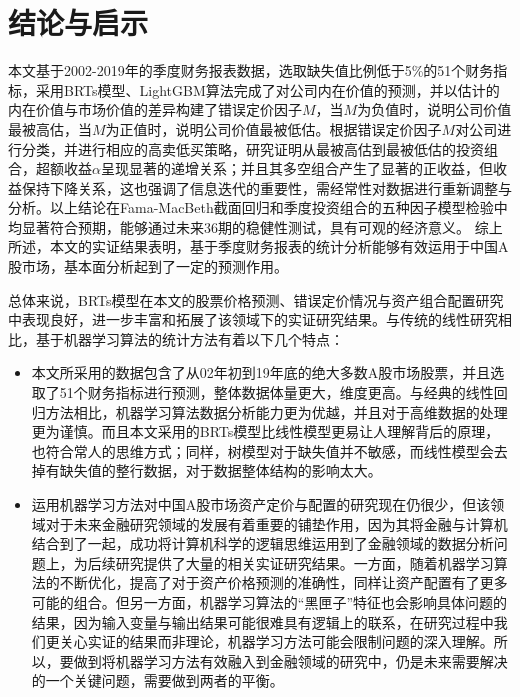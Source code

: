 
\chapter{结论与启示}
本文基于2002-2019年的季度财务报表数据，选取缺失值比例低于5\%的51个财务指标，采用BRTs模型、LightGBM算法完成了对公司内在价值的预测，并以估计的内在价值与市场价值的差异构建了错误定价因子$M$，当$M$为负值时，说明公司价值最被高估，当$M$为正值时，说明公司价值最被低估。根据错误定价因子$M$对公司进行分类，并进行相应的高卖低买策略，研究证明从最被高估到最被低估的投资组合，超额收益$\alpha$呈现显著的递增关系；并且其多空组合产生了显著的正收益，但收益保持下降关系，这也强调了信息迭代的重要性，需经常性对数据进行重新调整与分析。以上结论在Fama-MacBeth截面回归和季度投资组合的五种因子模型检验中均显著符合预期，能够通过未来36期的稳健性测试，具有可观的经济意义。
综上所述，本文的实证结果表明，基于季度财务报表的统计分析能够有效运用于中国A股市场，基本面分析起到了一定的预测作用。

总体来说，BRTs模型在本文的股票价格预测、错误定价情况与资产组合配置研究中表现良好，进一步丰富和拓展了该领域下的实证研究结果。与传统的线性研究相比，基于机器学习算法的统计方法有着以下几个特点：
\begin{itemize}
\item 本文所采用的数据包含了从02年初到19年底的绝大多数A股市场股票，并且选取了51个财务指标进行预测，整体数据体量更大，维度更高。与经典的线性回归方法相比，机器学习算法数据分析能力更为优越，并且对于高维数据的处理更为谨慎。而且本文采用的BRTs模型比线性模型更易让人理解背后的原理，也符合常人的思维方式；同样，树模型对于缺失值并不敏感，而线性模型会去掉有缺失值的整行数据，对于数据整体结构的影响太大。
\item 运用机器学习方法对中国A股市场资产定价与配置的研究现在仍很少，但该领域对于未来金融研究领域的发展有着重要的铺垫作用，因为其将金融与计算机结合到了一起，成功将计算机科学的逻辑思维运用到了金融领域的数据分析问题上，为后续研究提供了大量的相关实证研究结果\cite{zhaoJiQiXueXiZaiJinRongZiChanJieGeYuCeHePeiZhiZhongDeYingYongYanJiuShuPing2020}。一方面，随着机器学习算法的不断优化，提高了对于资产价格预测的准确性，同样让资产配置有了更多可能的组合。但另一方面，机器学习算法的“黑匣子”特征也会影响具体问题的结果，因为输入变量与输出结果可能很难具有逻辑上的联系，在研究过程中我们更关心实证的结果而非理论，机器学习方法可能会限制问题的深入理解。所以，要做到将机器学习方法有效融入到金融领域的研究中，仍是未来需要解决的一个关键问题，需要做到两者的平衡。
\end{itemize}



